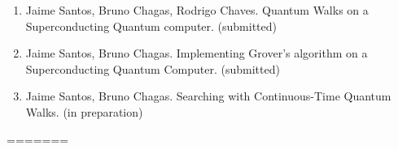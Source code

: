 \documentclass[../../dissertation.tex]{subfiles}
\begin{document}
\begin{enumerate}
	\item Jaime Santos, Bruno Chagas, Rodrigo Chaves. Quantum Walks on a Superconducting Quantum computer. (submitted)
	\item Jaime Santos, Bruno Chagas. Implementing Grover's algorithm on a Superconducting Quantum Computer. (submitted)
	\item Jaime Santos, Bruno Chagas. Searching with Continuous-Time Quantum Walks. (in preparation)
	
\end{enumerate}
=======
\end{document}
